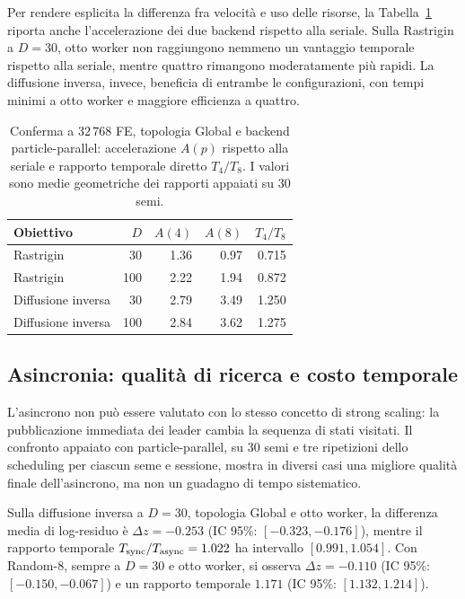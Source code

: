 Per rendere esplicita la differenza fra velocità e uso delle risorse, la Tabella~\ref{tab:confirmed-workers} riporta anche l'accelerazione dei due backend rispetto alla seriale. Sulla Rastrigin a $D=30$, otto worker non raggiungono nemmeno un vantaggio temporale rispetto alla seriale, mentre quattro rimangono moderatamente più rapidi. La diffusione inversa, invece, beneficia di entrambe le configurazioni, con tempi minimi a otto worker e maggiore efficienza a quattro.

\begin{table}[t]
\centering\small
\caption{Conferma a $32\,768$ FE, topologia Global e backend particle-parallel: accelerazione $A(p)$ rispetto alla seriale e rapporto temporale diretto $T_4/T_8$. I valori sono medie geometriche dei rapporti appaiati su 30 semi.}
\label{tab:confirmed-workers}
\begin{tabular}{@{}lrrrr@{}}
\toprule
Obiettivo & $D$ & $A(4)$ & $A(8)$ & $T_4/T_8$\\
\midrule
Rastrigin & 30  & 1.36 & 0.97 & 0.715\\
Rastrigin & 100 & 2.22 & 1.94 & 0.872\\
Diffusione inversa & 30  & 2.79 & 3.49 & 1.250\\
Diffusione inversa & 100 & 2.84 & 3.62 & 1.275\\
\bottomrule
\end{tabular}
\end{table}

\subsection{Asincronia: qualità di ricerca e costo temporale}\label{subsec:res-async}
L'asincrono non può essere valutato con lo stesso concetto di strong scaling: la pubblicazione immediata dei leader cambia la sequenza di stati visitati. Il confronto appaiato con particle-parallel, su $30$ semi e tre ripetizioni dello scheduling per ciascun seme e sessione, mostra in diversi casi una migliore qualità finale dell'asincrono, ma non un guadagno di tempo sistematico.

Sulla diffusione inversa a $D=30$, topologia Global e otto worker, la differenza media di log-residuo è $\Delta z=-0.253$ (IC 95\%: $[-0.323,-0.176]$), mentre il rapporto temporale $T_{\rm sync}/T_{\rm async}=1.022$ ha intervallo $[0.991,1.054]$. Con Random-8, sempre a $D=30$ e otto worker, si osserva $\Delta z=-0.110$ (IC 95\%: $[-0.150,-0.067]$) e un rapporto temporale $1.171$ (IC 95\%: $[1.132,1.214]$).

